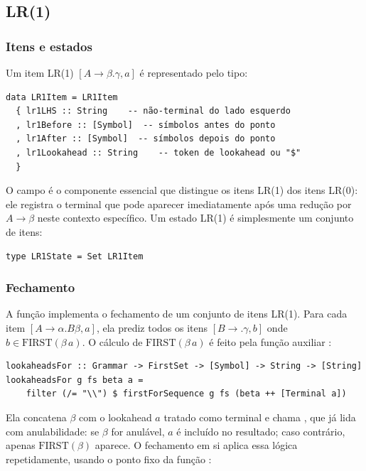 \subsection{LR(1)}

\subsubsection{Itens e estados}

Um item LR(1) \([A \to \beta . \gamma, a]\) é representado pelo tipo:

\begin{verbatim}
data LR1Item = LR1Item
  { lr1LHS :: String    -- não-terminal do lado esquerdo
  , lr1Before :: [Symbol]  -- símbolos antes do ponto
  , lr1After :: [Symbol]  -- símbolos depois do ponto
  , lr1Lookahead :: String    -- token de lookahead ou "$"
  }
\end{verbatim}

O campo  é o componente
essencial que distingue os itens LR(1) dos itens LR(0): ele registra
o terminal que pode aparecer imediatamente após uma redução por \(A
\to \beta\) neste contexto específico. Um estado LR(1) é simplesmente
um conjunto de itens:

\begin{verbatim}
type LR1State = Set LR1Item
\end{verbatim}

\subsubsection{Fechamento}

A função  implementa o fechamento de
um conjunto de itens LR(1). Para cada item \([A \to \alpha . B \beta,
a]\), ela prediz todos os itens \([B \to . \gamma, b]\) onde \(b \in
\text{FIRST}(\beta\,a)\). O cálculo de \(\text{FIRST}(\beta\,a)\) é
feito pela função auxiliar :

\begin{verbatim}
lookaheadsFor :: Grammar -> FirstSet -> [Symbol] -> String -> [String]
lookaheadsFor g fs beta a =
    filter (/= "\\") $ firstForSequence g fs (beta ++ [Terminal a])
\end{verbatim}

Ela concatena \(\beta\) com o lookahead \(a\) tratado como terminal e
chama , que já lida com
anulabilidade: se \(\beta\) for anulável, \(a\) é incluído no
resultado; caso contrário, apenas \(\text{FIRST}(\beta)\) aparece. O
fechamento em si aplica essa lógica repetidamente, usando o ponto
fixo da função :

